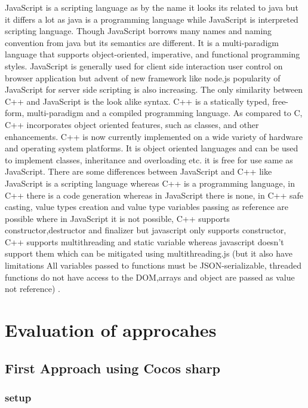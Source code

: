 \documentclass[23pt]{article}
\begin{document}
{\Large JavaScript is a scripting language as by the name it looks its related to java but it differs a lot as java is a programming language while JavaScript is interpreted scripting language. Though JavaScript borrows many names and naming convention from java but its semantics are different. It is a multi-paradigm language that supports object-oriented, imperative, and functional programming styles. JavaScript is generally used for client side interaction user control on browser application but advent of new framework like node.js popularity of JavaScript for server side scripting is also increasing. The only similarity between C++ and JavaScript is the look alike syntax. C++ is a statically typed, free-form, multi-paradigm and a compiled programming language. As compared to C, C++ incorporates object oriented features, such as classes, and other enhancements. C++ is now currently implemented on a wide variety of hardware and operating system platforms. It is object oriented languages and can be used to implement classes, inheritance and overloading etc. it is free for use same as JavaScript. There are some differences between JavaScript and C++ like JavaScript is a scripting language whereas C++ is a programming language, in C++ there is a code generation whereas in JavaScript there is none, in C++ safe casting, value types creation and value type variables passing as reference are possible where in JavaScript it is not possible, C++ supports constructor,destructor and finalizer but javascript only supports constructor, C++ supports multithreading and static variable whereas javascript doesn’t  support them  which can be mitigated using multithreading.js (but it also have limitations All variables passed to functions must be JSON-serializable, threaded functions do not have access to the DOM,arrays and object are passed as value not reference) . \\ \par}


\section{Evaluation of approcahes}

\subsection{First Approach using Cocos sharp}

\subsubsection{setup}
\end{document}
